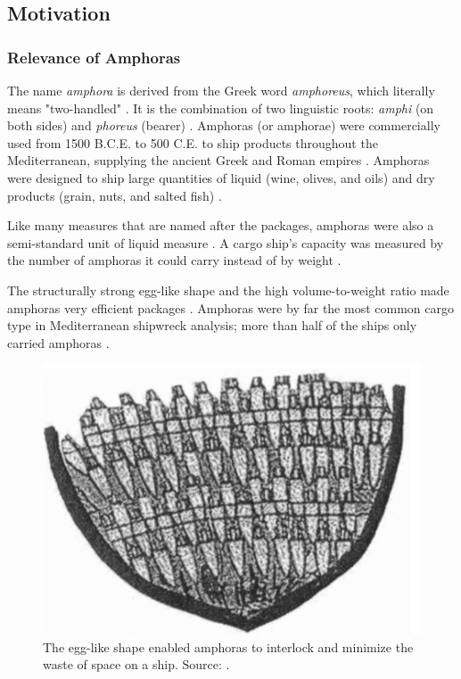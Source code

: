 \documentclass[a4paper,11pt,oneside]{article}
\begin{document}

  \subsection{Motivation}

  \subsubsection{Relevance of Amphoras}

  The name \textit{amphora} is derived from the Greek word \textit{amphoreus}, which literally means "two-handled"
  \cite{harper2001online, twede2002commercial}. It is the combination of two linguistic roots: \textit{amphi}
  (on both sides) and \textit{phoreus} (bearer) \cite{harper2001online, twede2002commercial}. Amphoras (or amphorae)
  were commercially used from 1500 B.C.E. to 500 C.E. to ship products throughout the Mediterranean,
  supplying the ancient Greek and Roman empires \cite{twede2002commercial}. Amphoras were designed to ship large quantities
  of liquid (wine, olives, and oils) and dry products (grain, nuts, and salted fish) \cite{twede2002commercial}.

  Like many measures that are named after the packages, amphoras were also a semi-standard unit of liquid
  measure \cite{twede2002commercial}. A cargo ship's capacity was measured by the number of amphoras it could carry
  instead of by weight \cite{twede2002commercial,cousteau1954fish}.

  The structurally strong egg-like shape and the high volume-to-weight ratio made amphoras very efficient packages
  \cite{twede2002commercial}. Amphoras were by far the most common cargo type in Mediterranean shipwreck analysis;
  more than half of the ships only carried amphoras \cite{twede2002commercial,parker1984shipwrecks}.

  \begin{figure}[ht]
    \begin{center}
      \includegraphics[width=.8\textwidth]{amphora_stowage_aboard_ship.png}
    \end{center}
    \caption{The egg-like shape enabled amphoras to interlock and minimize the waste of space on a ship.
    Source: \cite{twede2002commercial}.}
  \end{figure}
\end{document}
